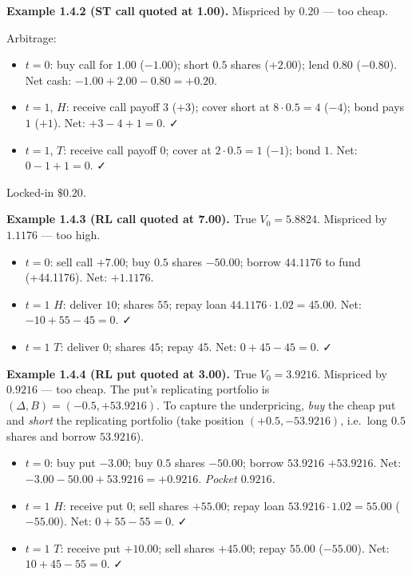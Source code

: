 \documentclass[
  10pt,
  twoside]{book}
\providecommand{\tightlist}{%
  \setlength{\itemsep}{0pt}\setlength{\parskip}{0pt}}
\begin{document}
\textbf{Example 1.4.2 (ST call quoted at 1.00).} Mispriced by \(0.20\)
--- too cheap.

Arbitrage:

\begin{itemize}
\tightlist
\item
  \(t=0\): buy call for \(1.00\) (\(-1.00\)); short \(0.5\) shares
  (\(+2.00\)); lend \(0.80\) (\(-0.80\)). Net cash:
  \(-1.00+2.00-0.80 = +0.20\).
\item
  \(t=1\), \(H\): receive call payoff \(3\) (\(+3\)); cover short at
  \(8\cdot 0.5=4\) (\(-4\)); bond pays \(1\) (\(+1\)). Net:
  \(+3-4+1=0\). ✓
\item
  \(t=1\), \(T\): receive call payoff \(0\); cover at \(2\cdot 0.5=1\)
  (\(-1\)); bond \(1\). Net: \(0-1+1=0\). ✓
\end{itemize}

Locked-in \(\$0.20\).

\textbf{Example 1.4.3 (RL call quoted at 7.00).} True \(V_0=5.8824\).
Mispriced by \(1.1176\) --- too high.

\begin{itemize}
\tightlist
\item
  \(t=0\): sell call \(+7.00\); buy \(0.5\) shares \(-50.00\); borrow
  \(44.1176\) to fund (+44.1176). Net: \(+1.1176\).
\item
  \(t=1\) \(H\): deliver \(10\); shares \(55\); repay loan
  \(44.1176\cdot 1.02=45.00\). Net: \(-10+55-45=0\). ✓
\item
  \(t=1\) \(T\): deliver \(0\); shares \(45\); repay \(45\). Net:
  \(0+45-45=0\). ✓
\end{itemize}

\textbf{Example 1.4.4 (RL put quoted at 3.00).} True \(V_0=3.9216\).
Mispriced by \(0.9216\) --- too cheap. The put's replicating portfolio
is \((\Delta,B)=(-0.5,+53.9216)\). To capture the underpricing,
\emph{buy} the cheap put and \emph{short} the replicating portfolio
(take position \((+0.5,-53.9216)\), i.e.~long \(0.5\) shares and borrow
\(53.9216\)).

\begin{itemize}
\tightlist
\item
  \(t=0\): buy put \(-3.00\); buy \(0.5\) shares \(-50.00\); borrow
  \(53.9216\) \(+53.9216\). Net: \(-3.00 - 50.00 + 53.9216 = +0.9216\).
  \emph{Pocket \(0.9216\).}
\item
  \(t=1\) \(H\): receive put \(0\); sell shares \(+55.00\); repay loan
  \(53.9216\cdot 1.02 = 55.00\) (\(-55.00\)). Net: \(0+55-55=0\). ✓
\item
  \(t=1\) \(T\): receive put \(+10.00\); sell shares \(+45.00\); repay
  \(55.00\) (\(-55.00\)). Net: \(10+45-55=0\). ✓
\end{itemize}
\end{document}
